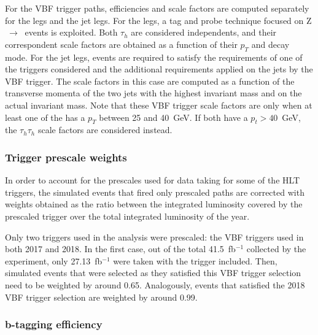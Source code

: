 \documentclass[../main.tex]{subfiles}
\begin{document}
For the VBF trigger paths, efficiencies and scale factors are computed separately for the \tauh{} legs and the jet legs. For the \tauh{} legs, a tag and probe technique focused on Z$~\to~$\taumu\tauh{} events is exploited. Both $\tau_h$ are considered independents, and their correspondent scale factors are obtained as a function of their $p_T$ and decay mode. For the jet legs, events are required to satisfy the requirements of one of the \tauh\tauh{} triggers considered and the additional requirements applied on the jets by the VBF trigger. The scale factors in this case are computed as a function of the transverse momenta of the two jets with the highest invariant mass and on the actual invariant mass. Note that these VBF trigger scale factors are only when at least one of the \tauh{} has a $p_T$ between 25 and 40~GeV. If both \tauh{} have a $p_t>40$~GeV, the $\tau_h\tau_h$ scale factors are considered instead.



\subsubsection*{Trigger prescale weights}
\label{hh:sec:prescale_sf}

In order to account for the prescales used for data taking for some of the HLT triggers, the simulated events that fired only prescaled paths are corrected with weights obtained as the ratio between the integrated luminosity covered by the prescaled trigger over the total integrated luminosity of the year.

Only two triggers used in the analysis were prescaled: the VBF triggers used in both 2017 and 2018. In the first case, out of the total 41.5~fb$^{-1}$ collected by the experiment, only 27.13~fb$^{-1}$ were taken with the trigger included. Then, simulated events that were selected as they satisfied this VBF trigger selection need to be weighted by around 0.65. Analogously, events that satisfied the 2018 VBF trigger selection are weighted by around 0.99.

\subsubsection*{b-tagging efficiency}
\end{document}
